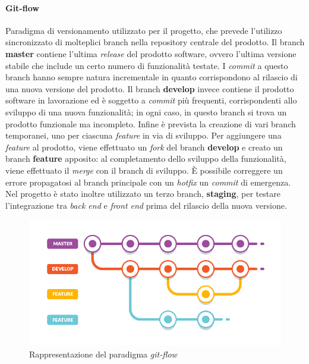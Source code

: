 \paragraph{Git-flow} Paradigma di versionamento utilizzato per il progetto, che prevede l'utilizzo sincronizzato di molteplici branch nella repository centrale del prodotto. Il branch \textbf{master} contiene l'ultima \textit{release} del prodotto software, ovvero l'ultima versione stabile che include un certo numero di funzionalità testate. I \textit{commit} a questo branch hanno sempre natura incrementale in quanto corrispondono al rilascio di una nuova versione del prodotto. Il branch \textbf{develop} invece contiene il prodotto software in lavorazione ed è soggetto a \textit{commit} più frequenti, corrispondenti allo sviluppo di una nuova funzionalità; in ogni caso, in questo branch si trova un prodotto funzionale ma incompleto. Infine è prevista la creazione di vari branch temporanei, uno per ciascuna \textit{feature} in via di sviluppo. Per aggiungere una \textit{feature} al prodotto, viene effettuato un \textit{fork} del branch \textbf{develop} e creato un branch  \textbf{feature} apposito: al completamento dello sviluppo della funzionalità, viene effettuato il \textit{merge} con il branch di sviluppo. È possibile correggere un errore propagatosi al branch principale con un \textit{hotfix} un \textit{commit} di emergenza.
Nel progetto è stato inoltre utilizzato un terzo branch, \textbf{staging}, per testare l'integrazione tra \textit{back end} e \textit{front end} prima del rilascio della nuova versione.

\begin{figure}[h!]
    \includegraphics[width=\textwidth]{figures/gitflow-1.png}
    \caption[Rappresentazione del paradigma \textit{git-flow}]{Rappresentazione del paradigma \textit{git-flow}
    \label{fig:gitflow}}
\end{figure}    

